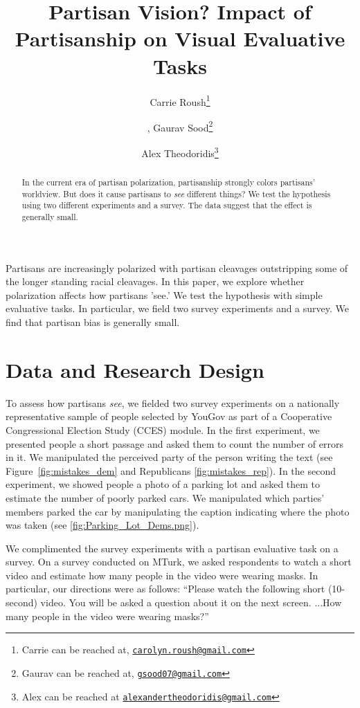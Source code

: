 \documentclass[12pt, letterpaper]{article}
\title{Partisan Vision? Impact of Partisanship on Visual Evaluative Tasks}
\author{Carrie Roush\thanks{Carrie can be reached at, \href{mailto:carolyn.roush@gmail.com}{\texttt{carolyn.roush@gmail.com}}} \and, Gaurav Sood\thanks{Gaurav can be reached at, \href{mailto:gsood07@gmail.com}{\texttt{gsood07@gmail.com}}} \and Alex Theodoridis\thanks{Alex can be reached at \href{alexandertheodoridis@gmail.com}{\texttt{alexandertheodoridis@gmail.com}}}}
\begin{document}
\maketitle
\thispagestyle{empty}

\begin{abstract}

\noindent In the current era of partisan polarization, partisanship strongly colors partisans' worldview. But does it cause partisans to \textit{see} different things? We test the hypothesis using two different experiments and a survey. The data suggest that the effect is generally small.
\end{abstract}

\newpage

\doublespacing

Partisans are increasingly polarized \cite{IyengarSoodLelkes2012} with partisan cleavages outstripping some of the longer standing racial cleavages. In this paper, we explore whether polarization affects how partisans 'see.' We test the hypothesis with simple evaluative tasks. In particular, we field two survey experiments and a survey. We find that partisan bias is generally small.

\section{Data and Research Design}
To assess how partisans \textit{see}, we fielded two survey experiments on a nationally representative sample of people selected by YouGov \citep{rivers2007} as part of a Cooperative Congressional Election Study (CCES) module. In the first experiment, we presented people a short passage and asked them to count the number of errors in it. We manipulated the perceived party of the person writing the text (see Figure~\ref{fig:mistakes_dem} and Republicans \ref{fig:mistakes_rep}). In the second experiment, we showed people a photo of a parking lot and asked them to estimate the number of poorly parked cars. We manipulated which parties' members parked the car by manipulating the caption indicating where the photo was taken (see \ref{fig:Parking_Lot_Dems.png}).

We complimented the survey experiments with a partisan evaluative task on a survey. On a survey conducted on MTurk, we asked respondents to watch a short video and estimate how many people in the video were wearing masks. In particular, our directions were as follows: ``Please watch the following short (10-second) video. You will be asked a question about it on the next screen. ...How many people in the video were wearing masks?''
\end{document}
